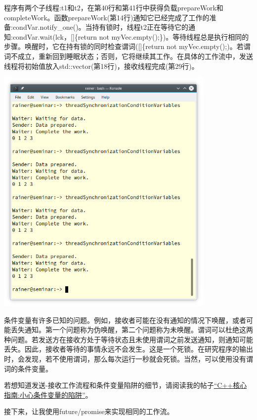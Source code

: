 程序有两个子线程:t1和t2，在第40行和第41行中获得负载prepareWork和completeWork。函数prepareWork(第14行)通知它已经完成了工作的准备:condVar.notify\_one()。当持有锁时，线程t2正在等待它的通知:condVar.wait(lck，[]\{return not myVec.empty();\})。等待线程总是执行相同的步骤。唤醒时，它在持有锁的同时检查谓词([]\{return not myVec.empty();)。若谓词不成立，重新回到睡眠状态；否则，它将继续其工作。在具体的工作流中，发送线程将初始值放入std::vector(第18行)，接收线程完成(第29行)。

\begin{center}
\includegraphics[width=0.8\textwidth]{content/3/chapter6/images/12.png}\\
\end{center}

条件变量有许多已知的问题。例如，接收者可能在没有通知的情况下唤醒，或者可能丢失通知。第一个问题称为伪唤醒，第二个问题称为未唤醒。谓词可以杜绝这两种问题。若发送方在接收方处于等待状态且未使用谓词之前发送通知，则通知可能丢失。因此，接收者等待的事情永远不会发生。这是一个死锁。在研究程序的输出时，会发现，若不使用谓词，那么每次运行一秒就会死锁。当然，可以使用没有谓词的条件变量。

若想知道发送-接收工作流程和条件变量陷阱的细节，请阅读我的帖子\href{https://www.modernescpp.com/index.php/c-core-guidelines-be-aware-of-the-traps-of-condition-variables}{“C++核心指南:小心条件变量的陷阱”}。

接下来，让我使用future/promise来实现相同的工作流。

